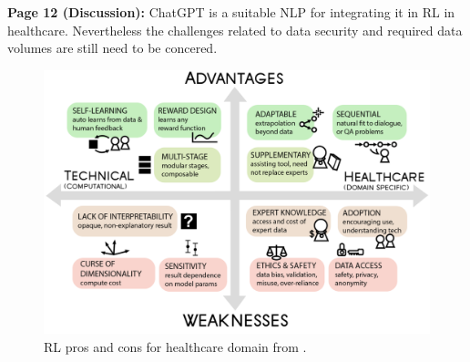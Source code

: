     \textbf{Page 12 (Discussion):}
    ChatGPT is a suitable NLP for integrating it in RL in healthcare. Nevertheless the challenges related to data security and required data volumes are still need to be concered. 
    \begin{figure}[H]
        \centering
        \includegraphics[width=1\textwidth]{figures/0022_SR06US23/fig6.png}
        \caption{RL pros and cons for healthcare domain from \cite{x090}.}
        \label{fig6:0022_SR06US23}
    \end{figure}